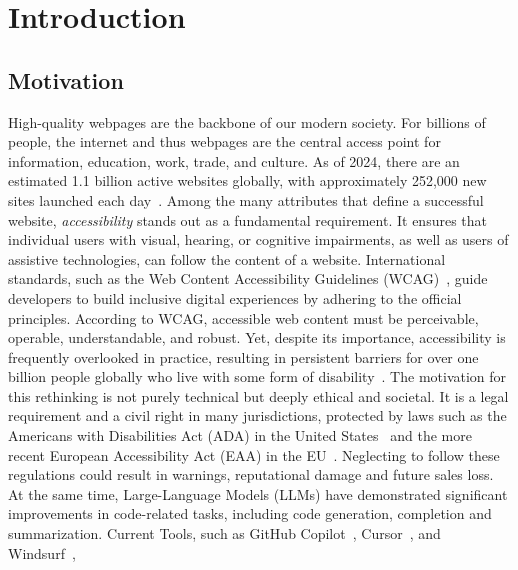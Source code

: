 
\chapter{Introduction}\label{chapter:introduction}

\section{Motivation}
High-quality webpages are the backbone of our modern society. 
For billions of people, the internet and thus webpages are the central access point 
for information, education, work, trade, and culture. 
As of 2024, there are an estimated 1.1 billion active websites 
globally, with approximately 252,000 new sites launched each
day~\cite{web:website}.\newline
Among the many attributes that define a successful website, \emph{accessibility} stands 
out as a fundamental requirement. It ensures that individual users
with visual, hearing, or cognitive
impairments, as well as users of assistive technologies, can follow the content
of a website.
International standards, such as the Web
Content Accessibility Guidelines (WCAG)~\cite{wcag21}, guide developers 
to build inclusive digital experiences by adhering to the official 
principles. According to WCAG, accessible web content must be 
perceivable, operable, understandable, and robust.
Yet, despite its importance, accessibility is frequently overlooked in
practice, resulting in persistent barriers for over one billion people globally who live with some
form of disability~\cite{web:disability}.\newline
The motivation for this rethinking is not purely technical but deeply ethical and societal. It is a
legal requirement and a civil right in many jurisdictions, protected by laws such as the Americans
with Disabilities Act (ADA) in the United States~\cite{web:ADA1990} and the more recent European Accessibility Act (EAA) in
the EU~\cite{web:EAA2019}. Neglecting to follow these regulations could result in warnings,
reputational damage and future sales loss.\newline
At the same time, Large-Language Models (LLMs) have demonstrated significant     
improvements in code-related tasks, including code generation, completion and 
summarization. Current Tools, such as  GitHub Copilot~\cite{web:copilot}, 
Cursor~\cite{web:cursor}, and Windsurf~\cite{web:windsurf},
